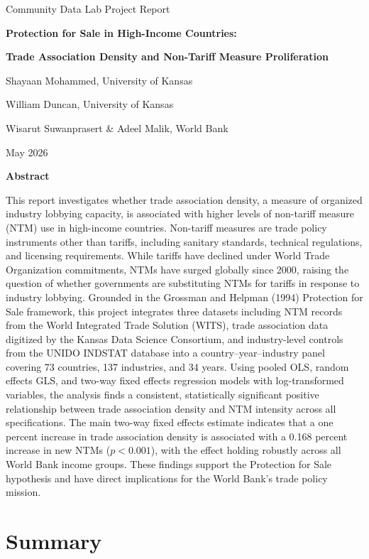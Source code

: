 \documentclass[12pt,letterpaper]{article}
\newcommand{\abstracttext}{%
This report investigates whether trade association density, a measure of organized industry lobbying capacity, is associated with higher levels of non-tariff measure (NTM) use in high-income countries. Non-tariff measures are trade policy instruments other than tariffs, including sanitary standards, technical regulations, and licensing requirements. While tariffs have declined under World Trade Organization commitments, NTMs have surged globally since 2000, raising the question of whether governments are substituting NTMs for tariffs in response to industry lobbying. Grounded in the Grossman and Helpman (1994) Protection for Sale framework, this project integrates three datasets including NTM records from the World Integrated Trade Solution (WITS), trade association data digitized by the Kansas Data Science Consortium, and industry-level controls from the UNIDO INDSTAT database into a country--year--industry panel covering 73 countries, 137 industries, and 34 years. Using pooled OLS, random effects GLS, and two-way fixed effects regression models with log-transformed variables, the analysis finds a consistent, statistically significant positive relationship between trade association density and NTM intensity across all specifications. The main two-way fixed effects estimate indicates that a one percent increase in trade association density is associated with a 0.168 percent increase in new NTMs ($p < 0.001$), with the effect holding robustly across all World Bank income groups. These findings support the Protection for Sale hypothesis and have direct implications for the World Bank's trade policy mission.%
}
\begin{document}
\begin{titlepage}
\centering
\vspace*{0.22in}

{\large Community Data Lab Project Report\par}
\vspace{0.3in}

{\Large\bfseries Protection for Sale in High-Income Countries:\par}
{\Large\bfseries Trade Association Density and Non-Tariff Measure Proliferation\par}

\vspace{0.32in}

{\large Shayaan Mohammed, University of Kansas\par}
{\large William Duncan, University of Kansas\par}
{\large Wisarut Suwanprasert \& Adeel Malik, World Bank\par}

\vspace{0.35in}

{\large May 2026\par}

\vspace{0.28in}
\begin{minipage}[t]{\linewidth}
\singlespacing
\setlength{\parskip}{0pt}
\setlength{\parindent}{15pt}

\begin{center}
{\large\bfseries Abstract}
\end{center}

\vspace{0.4em}
\abstracttext
\end{minipage}

\vfill
\end{titlepage}

\clearpage
{}
\setcounter{page}{2}
\tableofcontents
\newpage
{}
\setcounter{page}{1}
\doublespacing
\setlength{\parindent}{15pt}
\setlength{\parskip}{0pt}

\section{Summary}
\end{document}
